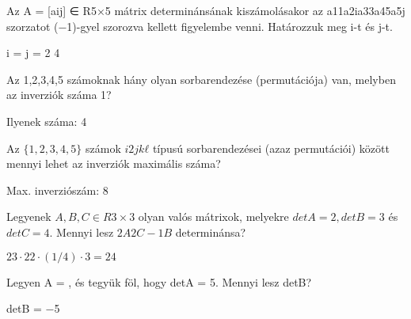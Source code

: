 \begin{frame}
  \begin{tcolorbox}[title={7/2. -R-}]
    Az A = [aij] ∈ R5×5 mátrix determinánsának kiszámolásakor az a11a2ia33a45a5j szorzatot (−1)-gyel szorozva kellett ﬁgyelembe venni. Határozzuk meg i-t és j-t.
  \tcblower

    \mmedskip 
    
    i = j =
2 4
  \end{tcolorbox}
\end{frame}


\begin{frame}
  \begin{tcolorbox}[title={7/3. -Q-}]
    Az {1,2,3,4,5} számoknak hány olyan sorbarendezése (permutációja) van, melyben az inverziók száma 1?
  \tcblower

    \mmedskip 
    
     Ilyenek száma: 4
  \end{tcolorbox}
\end{frame}


\begin{frame}
  \begin{tcolorbox}[title={7/4. -Q-}]
    Az $\{1,2,3,4,5\}$ számok $i2jkℓ$ típusú sorbarendezései (azaz permutációi) között mennyi lehet az inverziók maximális száma?
  \tcblower

    \mmedskip 
    Max. inverziószám: 8
  \end{tcolorbox}
\end{frame}

\begin{frame}
  \begin{tcolorbox}[title={7/5. -N-}]
    Legyenek $A,B,C ∈ R3×3$ olyan valós mátrixok, melyekre $detA = 2, detB = 3$ és $detC = 4$. Mennyi lesz $2A2C−1B$ determinánsa?
  \tcblower

    \mmedskip 
    
     $23 ·22 ·(1/4)·3 = 24$
  \end{tcolorbox}
\end{frame}

\begin{frame}
  \begin{tcolorbox}[title={7/6. -R-}]
    Legyen A =
, és
tegyük föl, hogy detA = 5. Mennyi lesz detB?

  \tcblower

    \mmedskip 
    
     detB = −5
  \end{tcolorbox}
\end{frame}


